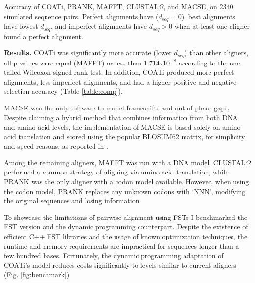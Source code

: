 \begin{table}[h!]
\centering
    \frame{}
	\caption{Accuracy of COATi, PRANK, MAFFT, CLUSTAL$\Omega$, and MACSE,
            on 2340 simulated sequence pairs. Perfect alignments have
            ($d_{seq}=0$), best alignments have lowest $d_{seq}$, and imperfect
            alignments have $d_{seq}>0$ when at least one aligner found a perfect
            alignment.}
	\label{table:comp}
\end{table}

\textbf{Results.}
COATi was significantly more accurate (lower $d_{seq}$) than other aligners, all
p-values were equal (MAFFT) or less than $1.714$x$10^{-8}$ according to the one-tailed
Wilcoxon signed rank test.
In addition, COATi produced more perfect alignments, less imperfect alignments,
and had a higher positive and negative selection accuracy
(Table \ref{table:comp}).

MACSE was the only software to model frameshifts and out-of-phase gaps.
Despite claiming a hybrid method that combines information from both DNA and
amino acid levels, the implementation of MACSE is based solely on amino acid
translation and scored using the popular BLOSUM62 \parencite{henikoff1992amino}
matrix, for simplicity and speed reasons, as reported in
\cite{ranwez_macse_2011}.

Among the remaining aligners, MAFFT was run with a DNA model, CLUSTAL$\Omega$
performed a common strategy of aligning via amino acid translation, while PRANK
was the only aligner with a codon model available.
However, when using the codon model, PRANK replaces any unknown codons with
`NNN', modifying the original sequences and losing information.


To showcase the limitations of pairwise alignment using FSTs I benchmarked
the FST version and the dynamic programming counterpart.
Despite the existence of efficient C++ FST libraries and the usage of known
optimization techniques, the runtime and memory requirements are impractical
for sequences longer than a few hundred bases.
Fortunately, the dynamic programming adaptation of COATi's model
reduces costs significantly to levels similar to current aligners
(Fig. \ref{fig:benchmark}).

